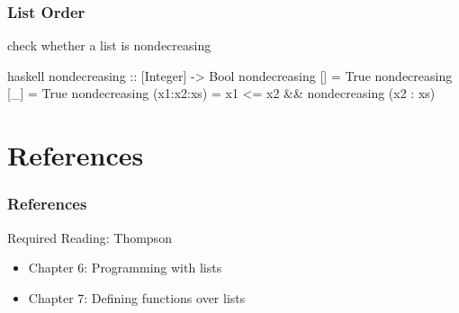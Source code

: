 \documentclass[dvipsnames]{beamer}
\theoremstyle{plain}
\begin{document}
\begin{frame}[fragile]
  \frametitle{List Order}

  \begin{exampleblock}{check whether a list is nondecreasing}
    \begin{pygments}{haskell}
nondecreasing :: [Integer] -> Bool
nondecreasing [] = True
nondecreasing [_] = True
nondecreasing (x1:x2:xs) = x1 <= x2
                           && nondecreasing (x2 : xs)
    \end{pygments}
  \end{exampleblock}
\end{frame}

\section*{References}

\begin{frame}
  \frametitle{References}

  \begin{block}{Required Reading: Thompson}
    \begin{itemize}
      \item Chapter 6: \alert{Programming with lists}
      \item Chapter 7: \alert{Defining functions over lists}
    \end{itemize}
  \end{block}
\end{frame}
\end{document}
